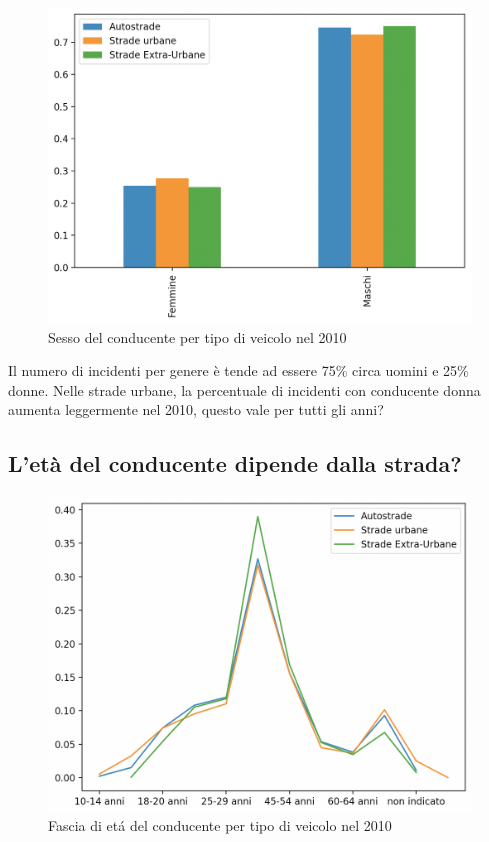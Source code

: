 \documentclass[a4paper]{report}
\begin{document}
\begin{figure}
    \includegraphics[width=\linewidth]{../src/incidenti/incidenti_senza_coords/tipo_veicoli/uomo-donna.png}
    \caption{Sesso del conducente per tipo di veicolo nel 2010}
    \label{fig:differenza_uomo_donna}
\end{figure}


Il numero di incidenti per genere è tende ad essere 75\% circa uomini e 25\% donne.
Nelle strade  urbane, la percentuale di incidenti con conducente donna aumenta leggermente nel 2010, 
questo vale per tutti gli anni?



\subsection{L'età del conducente dipende dalla strada?}

\begin{figure}
    \includegraphics[width=\linewidth]{../src/incidenti/incidenti_senza_coords/tipo_veicoli/differenza_eta.png}
    \caption{Fascia di et\'a del conducente per tipo di veicolo nel 2010}
    \label{fig:differenza_eta}
\end{figure}
\end{document}
